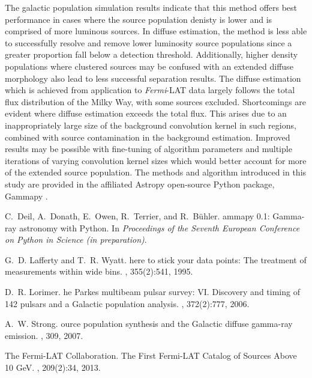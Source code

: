\documentclass{PoS}
\begin{document}
The galactic population simulation results indicate that this method offers best performance in cases where the source population denisty is lower and is comprised of more luminous sources. In diffuse estimation, the method is less able to successfully resolve and remove lower luminosity source populations since a greater proportion fall below a detection threshold. Additionally, higher density populations where clustered sources may be confused with an extended diffuse morphology also lead to less successful separation results. The diffuse estimation which is achieved from application to \textit{Fermi}-LAT data largely follows the total flux distribution of the Milky Way, with some sources excluded. Shortcomings are evident where diffuse estimation exceeds the total flux. This arises due to an inappropriately large size of the background convolution kernel in such regions, combined with source contamination in the background estimation. Improved results may be possible with fine-tuning of algorithm parameters and multiple iterations of varying convolution kernel sizes which would better account for more of the extended source population. The methods and algorithm introduced in this study are provided in the affiliated Astropy open-source Python package, Gammapy \cite{Deil}.

\begin{thebibliography}{99}

C.~Deil, A.~Donath, E.~Owen, R.~Terrier, and R.~B{\"{u}}hler.
ammapy {0.1}: {G}amma-ray astronomy with {P}ython.
\newblock In {\em {P}roceedings of the {S}eventh {E}uropean {C}onference on
  {P}ython in {S}cience (in preparation)}.

G.~D. Lafferty and T.~R. Wyatt.
here to stick your data points: {T}he treatment of measurements
  within wide bins.
,
  355(2):541, 1995.

D.~R. Lorimer.
he {P}arkes multibeam pulsar survey: {VI.} {D}iscovery and timing
  of 142 pulsars and a {G}alactic population analysis.
, 372(2):777,
  2006.

A.~W. Strong.
ource population synthesis and the {G}alactic diffuse gamma-ray
  emission.
, 309, 2007.

{The Fermi-LAT Collaboration}.
\newblock The {F}irst {Fermi-LAT} {C}atalog of {S}ources {A}bove 10 {GeV}.
, 209(2):34, 2013.


\end{thebibliography}
\end{document}

